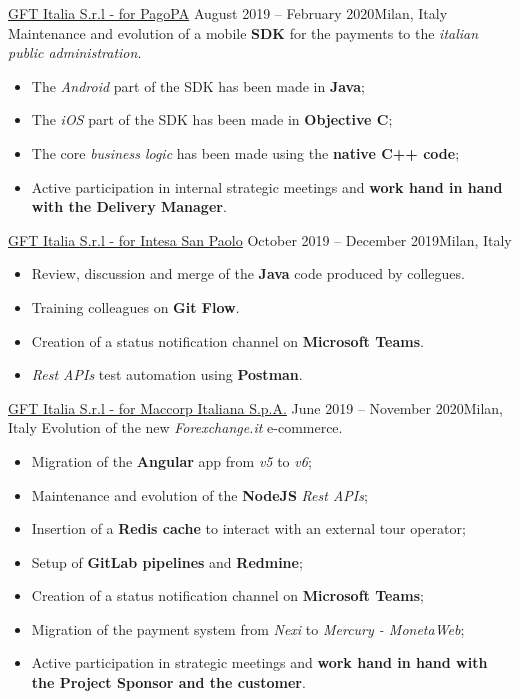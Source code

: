 \documentclass[10pt,a4paper]{altacv}
\begin{document}
\divider

{\href{https://www.pagopa.gov.it/}{GFT Italia S.r.l - for PagoPA}}
{August 2019 -- February 2020}{Milan, Italy}
Maintenance and evolution of a mobile \textbf{SDK} for the payments to the \textit{italian public administration}.
\newline
\begin{adjustwidth}{0cm}{-8cm}
\begin{itemize}
	\item The \textit{Android} part of the SDK has been made in \textbf{Java};
	\item The \textit{iOS} part of the SDK has been made in \textbf{Objective C};
	\item The core \textit{business logic} has been made using the \textbf{native C++ code};
	\item Active participation in internal strategic meetings and \textbf{work hand in hand with the Delivery Manager}.
\end{itemize}

\divider

{\href{https://www.intesasanpaolo.com/}{GFT Italia S.r.l - for Intesa San Paolo}}
{October 2019 -- December 2019}{Milan, Italy}
\begin{itemize}
	\item Review, discussion and merge of the \textbf{Java} code produced by collegues.
	\item Training colleagues on \textbf{Git Flow}.
	\item Creation of a status notification channel on \textbf{Microsoft Teams}.
	\item \textit{Rest APIs} test automation using \textbf{Postman}.
\end{itemize}

\divider

{\href{https://www.forexchange.it/}{GFT Italia S.r.l - for Maccorp Italiana S.p.A.}}
{June 2019 -- November 2020}{Milan, Italy}
Evolution of the new \textit{Forexchange.it} e-commerce.
\newline 
\begin{itemize}
	\item Migration of the \textbf{Angular} app from \textit{v5} to \textit{v6};
	\item Maintenance and evolution of the \textbf{NodeJS} \textit{Rest APIs};
	\item Insertion of a \textbf{Redis cache} to interact with an external tour operator;
	\item Setup of \textbf{GitLab pipelines} and \textbf{Redmine};
	\item Creation of a status notification channel on \textbf{Microsoft Teams};
	\item Migration of the payment system from \textit{Nexi} to \textit{Mercury - MonetaWeb};
	\item Active participation in strategic meetings and \textbf{work hand in hand with the Project Sponsor and the customer}.
\end{itemize}


\end{adjustwidth}
\end{document}
